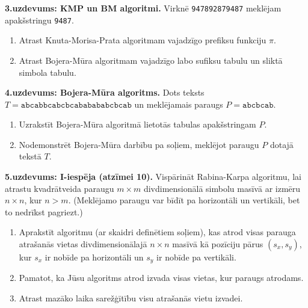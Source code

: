 \documentclass[11pt]{article}
\begin{document}
\vspace{6pt}
{\bf 3.uzdevums: KMP un BM algoritmi.} 
Virknē {\tt 947892879487} meklējam apakšstringu {\tt 9487}.
\begin{enumerate}[label=(\alph*)]
\item Atrast Knuta-Morisa-Prata algoritmam vajadzīgo prefiksu funkciju $\pi$. 
\item Atrast Bojera-Mūra algoritmam vajadzīgo labo sufiksu tabulu un sliktā simbola tabulu.
\end{enumerate}

\vspace{6pt}
{\bf 4.uzdevums: Bojera-Mūra algoritms.}
Dots teksts $T = \mathtt{abcabbcabcbcababababcbcab}$ un meklējamais paraugs
$P = \mathtt{abcbcab}$. 
\begin{enumerate}[label=(\alph*)]
\item Uzrakstīt Bojera-Mūra algoritmā lietotās tabulas apakšstringam $P$.
\item Nodemonstrēt Bojera-Mūra darbību pa soļiem, meklējot paraugu $P$ dotajā tekstā $T$.
\end{enumerate}



\vspace{6pt}
{\bf 5.uzdevums: I-iespēja (atzīmei 10).} 
Vispārināt Rabina-Karpa algoritmu, lai atrastu kvadrātveida paraugu $m \times m$
divdimensionālā simbolu masīvā ar izmēru $n \times n$, kur $n > m$.
(Meklējamo paraugu var bīdīt pa horizontāli un vertikāli, bet to nedrīkst pagriezt.) 
\begin{enumerate}[label=(\alph*)]
\item
Aprakstīt algoritmu (ar skaidri definētiem soļiem), 
kas atrod visas parauga atrašanās vietas divdimensionālajā
$n \times n$ masīvā kā pozīciju pārus $(s_x,s_y)$, kur $s_x$ ir nobīde pa horizontāli 
un $s_y$ ir nobīde pa vertikāli.
\item
Pamatot, ka Jūsu algoritms atrod izvada visas vietas, kur paraugs atrodams.
\item 
Atrast mazāko laika sarežģītību visu atrašanās vietu izvadei. 
\end{enumerate}
\end{document}
